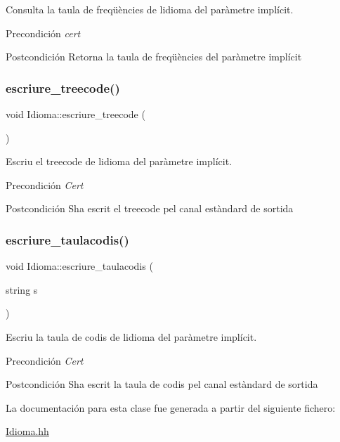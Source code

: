 Consulta la taula de freqüències de l\textquotesingle{}idioma del paràmetre implícit. 

\begin{DoxyPrecond}{Precondición}
{\itshape cert} 
\end{DoxyPrecond}
\begin{DoxyPostcond}{Postcondición}
Retorna la taula de freqüències del paràmetre implícit 
\end{DoxyPostcond}
\mbox{\label{class_idioma_a2c3024b18da125926668a2df2b178992}} 
\subsubsection{\texorpdfstring{escriure\+\_\+treecode()}{escriure\_treecode()}}
{\footnotesize\ttfamily void Idioma\+::escriure\+\_\+treecode (\begin{DoxyParamCaption}{ }\end{DoxyParamCaption})}



Escriu el treecode de l\textquotesingle{}idioma del paràmetre implícit. 

\begin{DoxyPrecond}{Precondición}
{\itshape Cert} 
\end{DoxyPrecond}
\begin{DoxyPostcond}{Postcondición}
S\textquotesingle{}ha escrit el treecode pel canal estàndard de sortida 
\end{DoxyPostcond}
\mbox{\label{class_idioma_a4f1102ff409d13738ff09268e8e045da}} 
\subsubsection{\texorpdfstring{escriure\+\_\+taulacodis()}{escriure\_taulacodis()}}
{\footnotesize\ttfamily void Idioma\+::escriure\+\_\+taulacodis (\begin{DoxyParamCaption}\item[{string}]{s }\end{DoxyParamCaption})}



Escriu la taula de codis de l\textquotesingle{}idioma del paràmetre implícit. 

\begin{DoxyPrecond}{Precondición}
{\itshape Cert} 
\end{DoxyPrecond}
\begin{DoxyPostcond}{Postcondición}
S\textquotesingle{}ha escrit la taula de codis pel canal estàndard de sortida 
\end{DoxyPostcond}


La documentación para esta clase fue generada a partir del siguiente fichero\+:\begin{DoxyCompactItemize}
\item 
\hyperlink{_idioma_8hh}{Idioma.\+hh}\end{DoxyCompactItemize}
